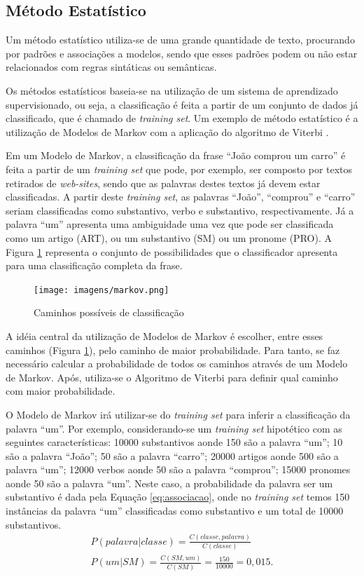 \subsection{Método Estatístico}
Um método estatístico utiliza-se de uma grande
quantidade de texto, procurando por padrões e
associações a modelos, sendo que esses padrões podem ou não estar relacionados
com regras sintáticas ou semânticas.

Os métodos estatísticos baseia-se na utilização de um sistema de aprendizado
supervisionado, ou seja, a classificação é feita a partir de um conjunto de dados já
classificado, que é chamado de \textit{training set}. Um exemplo de método
estatístico é a utilização de Modelos de Markov com a aplicação do algoritmo de
Viterbi \cite{manningschutze1999}.

Em um Modelo de Markov, a classificação da frase ``João comprou um
carro'' é feita a partir de um \textit{training set} que pode, por exemplo, ser
composto por textos retirados de \textit{web-sites}, sendo que as palavras
destes textos já devem estar classificadas. A partir deste \textit{training
set}, as palavras ``João'', ``comprou'' e ``carro'' seriam classificadas como
substantivo, verbo e substantivo, respectivamente. Já a palavra ``um'' apresenta uma ambiguidade uma vez que pode
ser classificada como um artigo (ART), ou um substantivo (SM) ou um pronome
(PRO).
A Figura \ref{fig:markov} representa o conjunto de possibilidades que o
classificador apresenta para uma classificação completa da frase.

\begin{figure}[htbp]
\centering
\texttt{[image: imagens/markov.png]}
\caption{Caminhos possíveis de classificação}
\label{fig:markov}
\end{figure}

A idéia central da utilização de Modelos de Markov é
escolher, entre esses caminhos (Figura \ref{fig:markov}), pelo caminho de maior
probabilidade. Para tanto, se faz necessário calcular a probabilidade de todos
os caminhos através de um Modelo de Markov. Após, utiliza-se o
Algoritmo de Viterbi para definir qual caminho com maior probabilidade.

O Modelo de Markov irá utilizar-se do \textit{training set} para inferir a
classificação da palavra ``um''. Por exemplo, considerando-se um
\textit{training set} hipotético com as seguintes características: 10000
substantivos aonde 150 são a palavra ``um''; 10
são a palavra ``João''; 50 são a palavra ``carro''; 20000 artigos aonde 500 são
a palavra ``um''; 12000 verbos aonde 50 são a palavra ``comprou''; 15000
pronomes aonde 50 são a palavra ``um''. Neste caso, a probabilidade da palavra
ser um substantivo é dada pela Equação \ref{eq:associacao}, onde no
\textit{training set} temos 150 instâncias da palavra ``um'' classificadas como
substantivo e um total de 10000 substantivos.
\begin{equation}
\begin{split}
P(palavra|classe) = \frac{C(classe,palavra)}{C(classe)}  \\
P(um|SM) = \frac{C(SM,um)}{C(SM)} = \frac{150}{10000} = 0,015.
\end{split}
\label{eq:associacao}
\end{equation}

